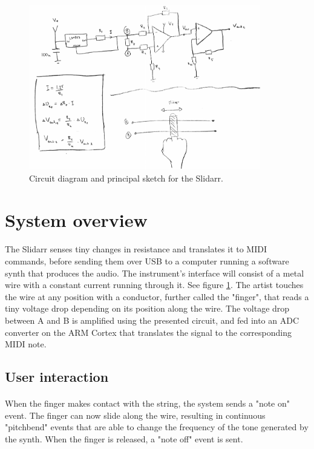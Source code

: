 \documentclass{article}
\begin{document}
\begin{figure}[h]
  \centering
  \includegraphics[width=0.9\textwidth]{circuit.png}
  \caption{Circuit diagram and principal sketch for the Slidarr.}
  \label{fig:circuit}
\end{figure}

\section{System overview}
\paragraph{}The Slidarr senses tiny changes in resistance and translates it to MIDI commands, before sending them over USB to a computer running a software synth that produces the audio. The instrument's interface will consist of a metal wire with a constant current running through it. See figure \ref{fig:circuit}. The artist touches the wire at any position with a conductor, further called the "finger", that reads a tiny voltage drop depending on its position along the wire. The voltage drop between A and B is amplified using the presented circuit, and fed into an ADC converter on the ARM Cortex that translates the signal to the corresponding MIDI note. 

\subsection{User interaction}
\paragraph{}When the finger makes contact with the string, the system sends a "note on" event. The finger can now slide along the wire, resulting in continuous "pitchbend" events that are able to change the frequency of the tone generated by the synth. When the finger is released, a "note off" event is sent.
\end{document}
